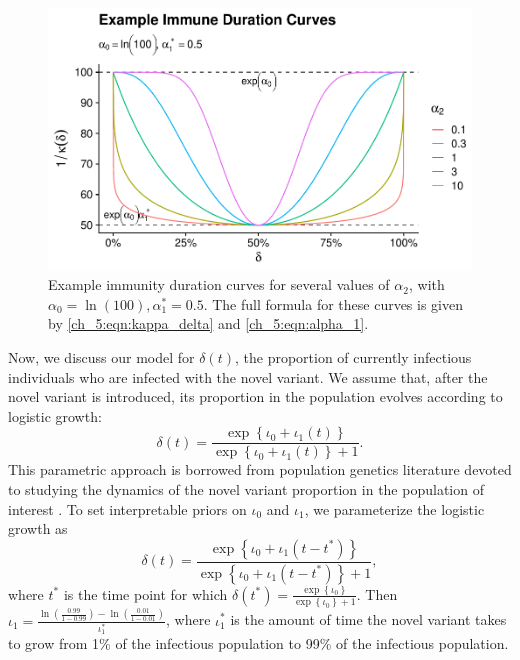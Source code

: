 \begin{figure}
    \centering
    \includegraphics[width=1.0\columnwidth]{example_immune_durration_plot.pdf}
    \caption[Example immunity duration curves.]{Example immunity duration curves for several values of \( \alpha_2 \), with \( \alpha_0 = \ln\left(100\right), \alpha_1^* = 0.5 \).
    The full formula for these curves is given by \eqref{ch_5:eqn:kappa_delta} and \eqref{ch_5:eqn:alpha_1}.}
    \label{ch_5:fig:example_immune_durration_plot}
\end{figure}

Now, we discuss our model for \( \delta(t) \), the proportion of currently infectious individuals who are infected with the novel variant.
We assume that, after the novel variant is introduced, its proportion in the population evolves according to logistic growth:
\begin{equation}
    \delta(t) = \frac{\exp \left\{ \iota_0 + \iota_1 \left( t \right) \right\}}{\exp \left\{ \iota_0 + \iota_1 \left( t \right) \right\} + 1}.
    \label{ch_5:eqn:logistic_growth}
\end{equation}
This parametric approach is borrowed from population genetics literature devoted to studying the dynamics of the novel variant proportion in the population of interest \citep{Lacerda2014Population, Zhao2023mechanism}.
To set interpretable priors on \( \iota_0 \) and \( \iota_1 \), we parameterize the logistic growth as 
\begin{equation}
    \delta(t) = \frac{\exp \left\{ \iota_0 + \iota_1 \left( t - t^* \right) \right\}}{\exp \left\{ \iota_0 + \iota_1 \left( t - t^* \right) \right\} + 1},
\end{equation}
where \( t^* \) is the time point for which \( \delta(t^*) = \frac{ \exp \left\{ \iota_0 \right\} }{\exp \left\{ \iota_0 \right\} + 1} \).
Then \( \iota_1 = \frac{\ln \left( \frac{0.99}{1 - 0.99} \right) - \ln \left( \frac{0.01}{1 - 0.01} \right)}{\iota_1^*} \), where \( \iota_1^* \) is the amount of time the novel variant takes to grow from 1\% of the infectious population to 99\% of the infectious population.

